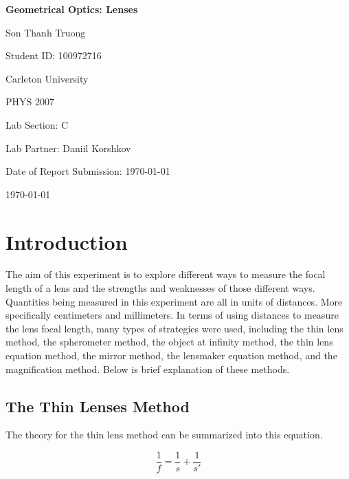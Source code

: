 \documentclass{article}
\begin{document}
\begin{titlepage}
    \centering
    \vspace*{3cm}

    {\Huge\bfseries Geometrical Optics: Lenses\par}

    \vspace{2cm}

    {\Large Son Thanh Truong\par}
    {\Large Student ID: 100972716\par}
    \vspace{0.5cm}
    {\large Carleton University\par}
    {\large PHYS 2007\par}
    {\large Lab Section: C\par}
    {\large Lab Partner: Daniil Korshkov\par}
    {\large Date of Report Submission: \today\par}
    
    
    \vfill

    {\large \today\par}
\end{titlepage}

\section{Introduction}
The aim of this experiment is to explore different ways to measure the focal length of a lens and the strengths and weaknesses of those different ways.
Quantities being measured in this experiment are all in units of distances. More specifically centimeters and millimeters.
In terms of using distances to measure the lens focal length, many types of strategies were used, including the thin lens method, the spherometer method, the object at infinity method, the thin lens equation method, the mirror method, the lensmaker equation method, and the magnification method. Below is brief explanation of these methods.

\subsection{The Thin Lenses Method}
The theory for the thin lens method can be summarized into this equation.
 
\label{eq:thin_lens}
\begin{equation}
\frac{1}{f} = \frac{1}{s} + \frac{1}{s'}
\end{equation}
\end{document}
